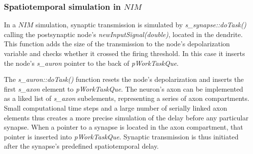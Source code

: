 			\subsubsection{Spatiotemporal simulation in $NIM$}
			In a $NIM$ simulation, synaptic transmission is simulated by \emph{s\_synapse::doTask()} calling the postsynaptic node's \emph{newInputSignal(\emph{double})}, located in the dendrite. %
			This function adds the size of the transmission to the node's depolarization variable and checks whether it crossed the firing threshold.
			In this case it inserts the node's \emph{s\_auron} pointer to the back of \emph{pWorkTaskQue}.
			
			The \emph{s\_auron::doTask()} function resets the node's depolarization and inserts the first \emph{s\_axon} element to \emph{pWorkTaskQue}.
			The neuron's axon can be implemented as a liked list of \emph{s\_axon} subelements, representing a series of axon compartments.
			Small computational time steps and a large number of serially linked axon elements thus creates a more precise simulation of the delay before any particular synapse.
			When a pointer to a synapse is located in the axon compartment, that pointer is inserted into \emph{pWorkTaskQue}.
			Synaptic transmission is thus initiated after the synapse's predefined spatiotemporal delay.

